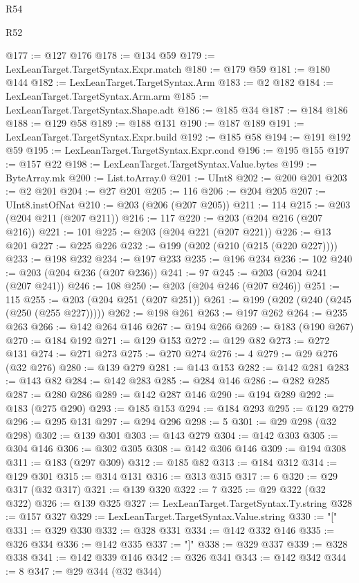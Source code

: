 \begin{lexlean}{R54}
\begin{lexlean}{R52}
\begin{coremodule}
{{{{{{{{{{{{{{{{{{{{{{{{{{{{{{{{{{{{{{{{{{{{{{{{{{{{{{{{{{{{{{{{{{{{{{{{{{{{{{{{{{{{{{{{{{{{{{{{{{{{{{{{{{{{{{{{{{{{{{{{{{{{{{{{{{{{{{{{{{{{{{{{{{{{{{{{{{{{{{{{{{{{{{{{{{{{{{{{{{{{{{{{{{{{{{{{{{{{{{@177 := @127 @176
@178 := @134 @59
@179 := LexLeanTarget.TargetSyntax.Expr.match
@180 := @179 @59
@181 := @180 @144
@182 := LexLeanTarget.TargetSyntax.Arm
@183 := @2 @182
@184 := LexLeanTarget.TargetSyntax.Arm.arm
@185 := LexLeanTarget.TargetSyntax.Shape.adt
@186 := @185 @34
@187 := @184 @186
@188 := @129 @58
@189 := @188 @131
@190 := @187 @189
@191 := LexLeanTarget.TargetSyntax.Expr.build
@192 := @185 @58
@194 := @191 @192 @59
@195 := LexLeanTarget.TargetSyntax.Expr.cond
@196 := @195 @155
@197 := @157 @22
@198 := LexLeanTarget.TargetSyntax.Value.bytes
@199 := ByteArray.mk
@200 := List.toArray.{0}
@201 := UInt8
@202 := @200 @201
@203 := @2 @201
@204 := @27 @201
@205 := 116
@206 := @204 @205
@207 := UInt8.instOfNat
@210 := @203 (@206 (@207 @205))
@211 := 114
@215 := @203 (@204 @211 (@207 @211))
@216 := 117
@220 := @203 (@204 @216 (@207 @216))
@221 := 101
@225 := @203 (@204 @221 (@207 @221))
@226 := @13 @201
@227 := @225 @226
@232 := @199 (@202 (@210 (@215 (@220 @227))))
@233 := @198 @232
@234 := @197 @233
@235 := @196 @234
@236 := 102
@240 := @203 (@204 @236 (@207 @236))
@241 := 97
@245 := @203 (@204 @241 (@207 @241))
@246 := 108
@250 := @203 (@204 @246 (@207 @246))
@251 := 115
@255 := @203 (@204 @251 (@207 @251))
@261 := @199 (@202 (@240 (@245 (@250 (@255 @227)))))
@262 := @198 @261
@263 := @197 @262
@264 := @235 @263
@266 := @142 @264 @146
@267 := @194 @266
@269 := @183 (@190 @267)
@270 := @184 @192
@271 := @129 @153
@272 := @129 @82
@273 := @272 @131
@274 := @271 @273
@275 := @270 @274
@276 := 4
@279 := @29 @276 (@32 @276)
@280 := @139 @279
@281 := @143 @153
@282 := @142 @281
@283 := @143 @82
@284 := @142 @283
@285 := @284 @146
@286 := @282 @285
@287 := @280 @286
@289 := @142 @287 @146
@290 := @194 @289
@292 := @183 (@275 @290)
@293 := @185 @153
@294 := @184 @293
@295 := @129 @279
@296 := @295 @131
@297 := @294 @296
@298 := 5
@301 := @29 @298 (@32 @298)
@302 := @139 @301
@303 := @143 @279
@304 := @142 @303
@305 := @304 @146
@306 := @302 @305
@308 := @142 @306 @146
@309 := @194 @308
@311 := @183 (@297 @309)
@312 := @185 @82
@313 := @184 @312
@314 := @129 @301
@315 := @314 @131
@316 := @313 @315
@317 := 6
@320 := @29 @317 (@32 @317)
@321 := @139 @320
@322 := 7
@325 := @29 @322 (@32 @322)
@326 := @139 @325
@327 := LexLeanTarget.TargetSyntax.Ty.string
@328 := @157 @327
@329 := LexLeanTarget.TargetSyntax.Value.string
@330 := "["
@331 := @329 @330
@332 := @328 @331
@334 := @142 @332 @146
@335 := @326 @334
@336 := @142 @335
@337 := "]"
@338 := @329 @337
@339 := @328 @338
@341 := @142 @339 @146
@342 := @326 @341
@343 := @142 @342
@344 := 8
@347 := @29 @344 (@32 @344)
}}}}}}}}}}}}}}}}}}}}}}}}}}}}}}}}}}}}}}}}}}}}}}}}}}}}}}}}}}}}}}}}}}}}}}}}}}}}}}}}}}}}}}}}}}}}}}}}}}}}}}}}}}}}}}}}}}}}}}}}}}}}}}}}}}}}}}}}}}}}}}}}}}}}}}}}}}}}}}}}}}}}}}}}}}}}}}}}}}}}}}}}}}}}}}}}}}}}}}
\end{coremodule}
\end{lexlean}
\end{lexlean}
